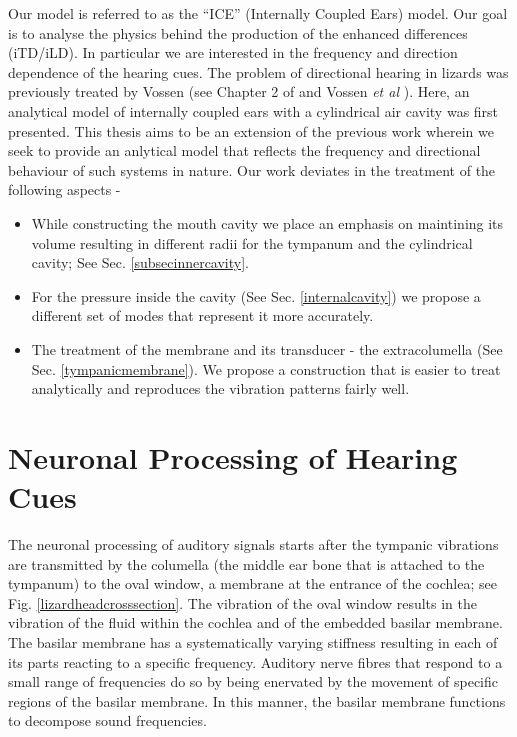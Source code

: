 Our model is referred to as the ``ICE'' (Internally Coupled Ears) model. Our goal is to analyse the physics behind the production of the
enhanced differences (iTD/iLD). In particular we are interested in the frequency and direction dependence of the hearing cues. The problem of
directional hearing in lizards was previously treated by Vossen (see Chapter 2 of \cite{vossenthesis} and Vossen \emph{et al} \cite{vossenjasa}).
Here, an analytical model of internally coupled ears with a cylindrical air cavity was first presented. This thesis aims to be an extension of the previous work
wherein we seek to provide an anlytical model that reflects the frequency and directional behaviour of such systems in nature. Our work deviates in
the treatment of the following aspects - 
\begin{itemize}
 \item While constructing the mouth cavity we place an emphasis on maintining its volume resulting in different radii for the tympanum and the cylindrical cavity; See Sec. \ref{subsecinnercavity}.
 \item For the pressure inside the cavity (See Sec. \ref{internalcavity}) we propose a different set of modes that represent it more accurately.
 \item The treatment of the membrane and its transducer - the extracolumella (See Sec. \ref{tympanicmembrane}). We propose a construction that is easier to treat analytically and reproduces
 the vibration patterns fairly well.
 \end{itemize}

\section{Neuronal Processing of Hearing Cues}\label{iceneuro}
The neuronal processing of auditory signals starts after the tympanic vibrations are transmitted by the columella (the middle ear bone that is attached to the tympanum)
to the oval window, a membrane at the entrance of the cochlea; see Fig. \ref{lizardheadcrosssection}. The vibration of the oval window results in the vibration of
the fluid within the cochlea and of the embedded basilar membrane. The basilar membrane has a systematically varying stiffness resulting in each of its parts 
reacting to a specific frequency. Auditory nerve fibres that respond to a small range of frequencies do so by being enervated by the movement of specific
regions of the basilar membrane. In this manner, the basilar membrane functions to decompose sound frequencies.

